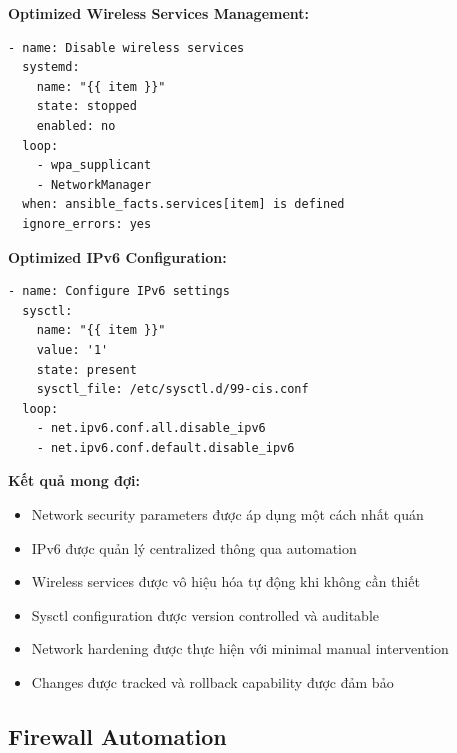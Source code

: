 \noindent \textbf{Optimized Wireless Services Management:}
\begin{verbatim}
- name: Disable wireless services
  systemd:
    name: "{{ item }}"
    state: stopped
    enabled: no
  loop:
    - wpa_supplicant
    - NetworkManager
  when: ansible_facts.services[item] is defined
  ignore_errors: yes
\end{verbatim}

\noindent \textbf{Optimized IPv6 Configuration:}
\begin{verbatim}
- name: Configure IPv6 settings
  sysctl:
    name: "{{ item }}"
    value: '1'
    state: present
    sysctl_file: /etc/sysctl.d/99-cis.conf
  loop:
    - net.ipv6.conf.all.disable_ipv6
    - net.ipv6.conf.default.disable_ipv6
\end{verbatim}

\noindent \textbf{Kết quả mong đợi:}
\begin{itemize}
\item Network security parameters được áp dụng một cách nhất quán
\item IPv6 được quản lý centralized thông qua automation
\item Wireless services được vô hiệu hóa tự động khi không cần thiết
\item Sysctl configuration được version controlled và auditable
\item Network hardening được thực hiện với minimal manual intervention
\item Changes được tracked và rollback capability được đảm bảo
\end{itemize}

\subsection{Firewall Automation}

